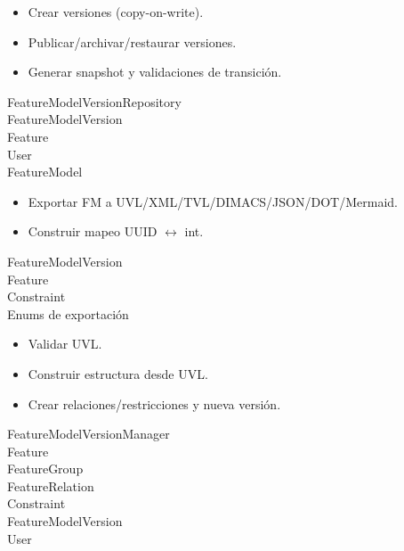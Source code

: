 \begin{addendum}
		\begin{crccard}
			\crcresp
			{
				\begin{itemize}
				\item Crear versiones (copy-on-write).
				\item Publicar/archivar/restaurar versiones.
				\item Generar snapshot y validaciones de transición.
				\end{itemize}
			}
			\crccolab
			{
				FeatureModelVersionRepository\\
				FeatureModelVersion\\
				Feature\\
				User\\
				FeatureModel
			}
		\end{crccard}

		\begin{crccard}
			\crcresp
			{
				\begin{itemize}
				\item Exportar \ac{FM} a \ac{UVL}/XML/TVL/DIMACS/\ac{JSON}/\ac{DOT}/Mermaid.
				\item Construir mapeo UUID $\leftrightarrow$ int.
				\end{itemize}
			}
			\crccolab
			{
				FeatureModelVersion\\
				Feature\\
				Constraint\\
				Enums de exportación
			}
		\end{crccard}

		\begin{crccard}
			\crcresp
			{
				\begin{itemize}
				\item Validar \ac{UVL}.
				\item Construir estructura desde \ac{UVL}.
				\item Crear relaciones/restricciones y nueva versión.
				\end{itemize}
			}
			\crccolab
			{
				FeatureModelVersionManager\\
				Feature\\
				FeatureGroup\\
				FeatureRelation\\
				Constraint\\
				FeatureModelVersion\\
				User
			}
		\end{crccard}


\end{addendum}
